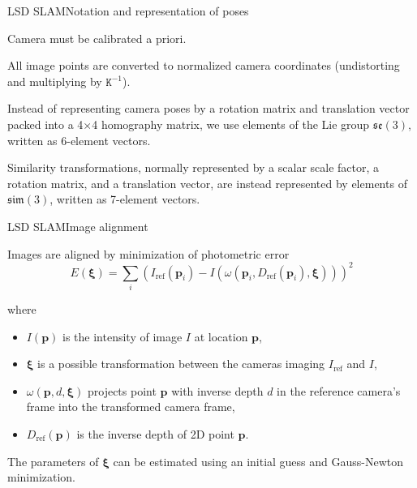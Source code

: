 \documentclass[aspectratio=169]{beamer}
\renewcommand{\vec}[1]{\boldsymbol{#1}}
\newcommand{\mat}[1]{\mathtt{#1}}
\newcommand{\lse}{\mathfrak{se}}
\newcommand{\lsim}{\mathfrak{sim}}
\begin{document}
\begin{frame}{LSD SLAM}{Notation and representation of poses}

  Camera must be \alert{calibrated} a priori.

  \medskip

  All image points are converted to
  \alert{normalized camera coordinates}
  (undistorting and multiplying by $\mat{K}^{-1}$).

  \medskip

  Instead of representing camera poses by a rotation matrix
  and translation vector packed into a 4$\times$4 homography matrix,
  we use elements of the Lie group $\lse(3)$,
  written as \alert{6-element vectors}.

  \medskip

  Similarity transformations, normally represented by a scalar scale
  factor, a rotation matrix, and a translation vector, are instead
  represented by elements of $\lsim(3)$, written as \alert{7-element
    vectors}.

\end{frame}


\begin{frame}{LSD SLAM}{Image alignment}

  Images are aligned by minimization of \alert{photometric error}
  $$E(\vec{\xi}) = \sum_i(I_{\textrm{ref}}(\vec{p}_i) - I(\omega(\vec{p}_i,
  D_{\textrm{ref}}(\vec{p}_i), \vec{\xi})))^2$$

  where
  \begin{itemize}
    \item $I(\vec{p})$ is the intensity of image $I$ at location $\vec{p}$,
    \item $\vec{\xi}$ is a possible transformation between the cameras
      imaging $I_{\textrm{ref}}$ and $I$,
    \item $\omega(\vec{p},d,\vec{\xi})$
      projects point $\vec{p}$ with inverse depth $d$ in the reference
      camera's frame into the transformed camera frame,
    \item $D_{\textrm{ref}}(\vec{p})$ is the inverse depth of 2D point
      $\vec{p}$.
  \end{itemize}

  The parameters of $\vec{\xi}$ can be estimated using an initial
  guess and Gauss-Newton minimization.
  
\end{frame}
\end{document}
